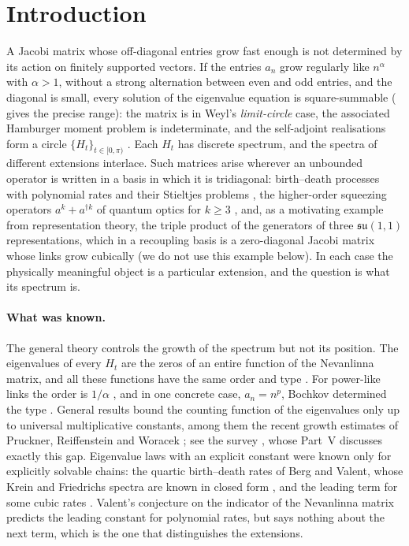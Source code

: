 \section{Introduction}\label{sec:intro}

A Jacobi matrix whose off-diagonal entries grow fast enough is not determined by its
action on finitely supported vectors. If the entries $a_n$ grow regularly like $n^\alpha$ with
$\alpha>1$, without a strong alternation between even and odd entries, and the diagonal is small,
every solution of the eigenvalue equation is square-summable ( gives the precise
range): the matrix is in Weyl's \emph{limit-circle} case, the associated Hamburger moment problem is
indeterminate, and the self-adjoint realisations form a circle $\{H_t\}_{t\in[0,\pi)}$
\cite{Akhiezer1965,Simon1998}. Each $H_t$ has discrete spectrum, and the spectra of different
extensions interlace. Such matrices arise wherever an unbounded operator is written in a basis in
which it is tridiagonal: birth--death processes with polynomial rates and their Stieltjes problems
\cite{BergValent1994,Valent1999}, the higher-order squeezing operators $a^k+a^{\dagger k}$ of quantum
optics for $k\ge3$ \cite{FBL2025}, and, as a motivating example from representation theory, the
triple product of the generators of three $\mathfrak{su}(1,1)$ representations, which in a recoupling
basis is a zero-diagonal Jacobi matrix whose links grow cubically (we do not use this example below).
In each case the physically meaningful object is a particular extension, and the question is what
its spectrum is.

\paragraph{What was known.} The general theory controls the growth of the spectrum but not
its position. The eigenvalues of every $H_t$ are the zeros of an entire function of the
Nevanlinna matrix, and all these functions have the same order and type
\cite{BergPedersen1994}. For power-like links the order is $1/\alpha$
\cite{BergSzwarc2017,Romanov2017}, and in one concrete case, $a_n=n^p$, Bochkov determined the
type \cite{Bochkov2021}. General results bound the counting function of the eigenvalues
only up to universal multiplicative constants, among them the recent growth estimates of Pruckner,
Reiffenstein and Woracek \cite{PRW2023,Reiffenstein2025}; see the survey \cite{ReiffensteinWoracek2025},
whose Part~V discusses exactly this gap. Eigenvalue laws with an explicit constant were
known only for explicitly solvable chains: the quartic birth--death rates of Berg and
Valent, whose Krein and Friedrichs spectra are known in closed form
\cite{BergValent1994,Valent2006,BergChenIsmail}, and the leading term for some cubic rates
\cite{GLV2005,GLRV2006}. Valent's conjecture on the indicator of the Nevanlinna matrix
\cite{Valent1999,BergSzwarc2017} predicts the leading constant for polynomial rates, but
says nothing about the next term, which is the one that distinguishes the extensions.

